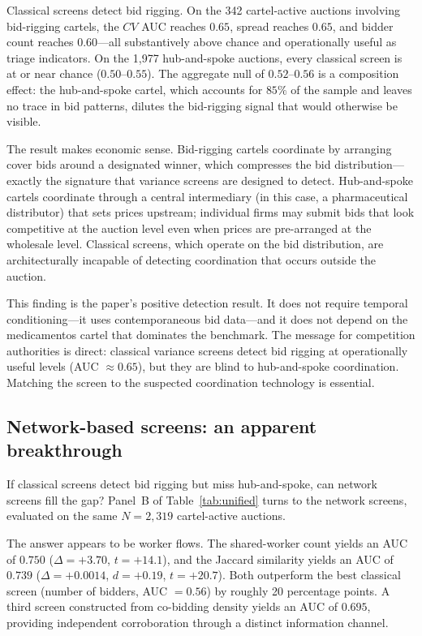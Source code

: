Classical screens detect bid rigging. On the 342 cartel-active auctions involving bid-rigging cartels, the $CV$ AUC reaches $0.65$, spread reaches $0.65$, and bidder count reaches $0.60$---all substantively above chance and operationally useful as triage indicators. On the 1{,}977 hub-and-spoke auctions, every classical screen is at or near chance ($0.50$--$0.55$). The aggregate null of $0.52$--$0.56$ is a composition effect: the hub-and-spoke cartel, which accounts for $85\%$ of the sample and leaves no trace in bid patterns, dilutes the bid-rigging signal that would otherwise be visible.

The result makes economic sense. Bid-rigging cartels coordinate by arranging cover bids around a designated winner, which compresses the bid distribution---exactly the signature that variance screens are designed to detect. Hub-and-spoke cartels coordinate through a central intermediary (in this case, a pharmaceutical distributor) that sets prices upstream; individual firms may submit bids that look competitive at the auction level even when prices are pre-arranged at the wholesale level. Classical screens, which operate on the bid distribution, are architecturally incapable of detecting coordination that occurs outside the auction.

This finding is the paper's positive detection result. It does not require temporal conditioning---it uses contemporaneous bid data---and it does not depend on the medicamentos cartel that dominates the benchmark. The message for competition authorities is direct: classical variance screens detect bid rigging at operationally useful levels (AUC $\approx 0.65$), but they are blind to hub-and-spoke coordination. Matching the screen to the suspected coordination technology is essential.

\subsection{Network-based screens: an apparent breakthrough}\label{sec:res_network}

If classical screens detect bid rigging but miss hub-and-spoke, can network screens fill the gap? Panel~B of Table~\ref{tab:unified} turns to the network screens, evaluated on the same $N = 2{,}319$ cartel-active auctions.

The answer appears to be worker flows. The shared-worker count yields an AUC of $0.750$ ($\Delta = +3.70$, $t = +14.1$), and the Jaccard similarity yields an AUC of $0.739$ ($\Delta = +0.0014$, $d = +0.19$, $t = +20.7$). Both outperform the best classical screen (number of bidders, AUC $= 0.56$) by roughly 20 percentage points. A third screen constructed from co-bidding density yields an AUC of $0.695$, providing independent corroboration through a distinct information channel.

